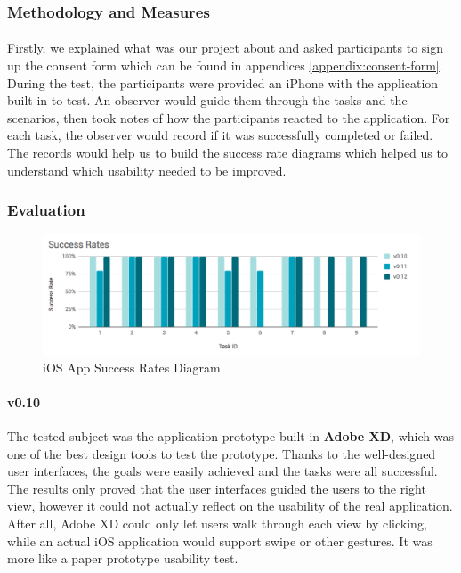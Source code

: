 \documentclass[12pt,a4paper]{article}
\begin{document}
        \subsubsection{Methodology and Measures}
          \paragraph{} Firstly, we explained what was our project about and asked participants to sign up the consent form which can be found in appendices \ref{appendix:consent-form}. During the test, the participants were provided an iPhone with the application built-in to test. An observer would guide them through the tasks and the scenarios, then took notes of how the participants reacted to the application. For each task, the observer would record if it was successfully completed or failed. The records would help us to build the success rate diagrams which helped us to understand which usability needed to be improved\cite{SuccessRates}. 
        
        \subsubsection{Evaluation}
          
          \begin{figure}[H]
            \centering
            \includegraphics[width=1\textwidth]{../assets/usability-test-success-rates.png}
            \caption{iOS App Success Rates Diagram}
            \label{fig:iOS App Success Rates Diagram}
          \end{figure}

          \paragraph{v0.10} The tested subject was the application prototype built in {\bf Adobe XD}, which was one of the best design tools to test the prototype. Thanks to the well-designed user interfaces, the goals were easily achieved and the  tasks were all successful. The results only proved that the user interfaces guided the users to the right view, however it could not actually reflect on the usability of the real application. After all, Adobe XD could only let users walk through each view by clicking, while an actual iOS application would support swipe or other gestures. It was more like a paper prototype usability test.
          
\end{document}

